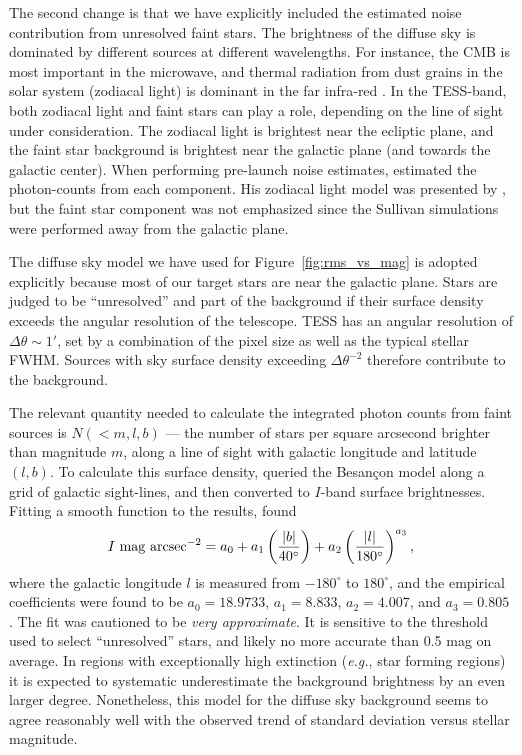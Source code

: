 \documentclass[12pt,twocolumn,tighten]{aastex62}
\begin{document}
The second change is that we have explicitly included the
estimated noise contribution from unresolved faint stars.  The
brightness of the diffuse sky is dominated by different sources at
different wavelengths.  For instance, the CMB is most important in
the microwave, and thermal radiation from dust grains in the solar
system (zodiacal light) is dominant in the far infra-red
\citep{leinert_1997_1998}.  In the TESS-band, both zodiacal light and
faint stars can play a role, depending on the line of sight under
consideration. The zodiacal light is brightest near the ecliptic
plane, and the faint star background is brightest near the galactic
plane (and towards the galactic center).  
When performing pre-launch noise estimates,
\citet{winn_background_2013}
estimated the photon-counts from each component.
His zodiacal light model was presented by \citet{Sullivan_et_al_2015},
but the faint star component was not emphasized since the Sullivan
simulations were performed away from the galactic plane.

The diffuse sky model we have used for Figure~\ref{fig:rms_vs_mag} is
adopted explicitly because most of our target stars are near the
galactic plane.
Stars are judged to be ``unresolved'' and part of the background if
their surface density exceeds the angular resolution of the telescope.
TESS has an angular resolution of $\Delta \theta \sim 1'$, set by a
combination of the pixel size as well as the typical stellar FWHM.
Sources with sky surface density exceeding $\Delta \theta^{-2}$
therefore contribute to the background.

The relevant quantity needed to calculate the integrated 
photon counts from faint sources
is  $N(<m,l,b)$ --- the number of stars per square arcsecond
brighter than magnitude $m$, along a line of sight with galactic
longitude and latitude $(l,b)$.
To calculate this surface density, \citet{winn_background_2013}
queried the Besan\c con model
\citep{robin_synthetic_2003}  along a grid of galactic sight-lines,
and then converted to $I$-band surface brightnesses.
Fitting a smooth function to the results, \citet{winn_background_2013}
found
\begin{equation}
I\ {\rm mag\ arcsec}^{-2} =
    a_0 + a_1 \left(\frac{|b|}{40^\circ}\right)
    + a_2 \left(\frac{|l|}{180^\circ}\right)^{a_3},
\end{equation}
where the galactic longitude $l$ is measured from $-180^\circ$ to
$180^\circ$, and the empirical coefficients were found to be $a_0 =
18.9733$, $a_1=8.833$, $a_2=4.007$, and $a_3=0.805$.  The fit was
cautioned to be {\it very approximate}.  It is sensitive to the
threshold used to select ``unresolved'' stars, and likely no more
accurate than 0.5 mag on average.  In regions with exceptionally high
extinction ({\it e.g.}, star forming regions) it is expected to
systematic underestimate the background brightness by an even larger
degree.
Nonetheless, this model for the diffuse sky background seems
to agree reasonably well with the observed trend of standard deviation
versus stellar magnitude.
\end{document}
